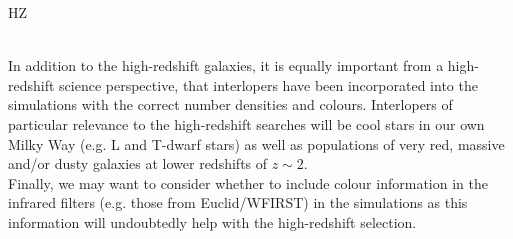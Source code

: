 \begin{tasklist}{HZ}
\begin{task}
{\\
In addition to the high-redshift galaxies, it is equally important from a high-redshift science perspective, that interlopers have been incorporated into the simulations with the correct number densities and colours. Interlopers of particular relevance to the high-redshift searches will be cool stars in our own Milky Way (e.g. L and T-dwarf stars) as well as populations of very red, massive and/or dusty galaxies at lower redshifts of $z\sim2$.
\\
Finally, we may want to consider whether to include colour information in the infrared filters (e.g. those from Euclid/WFIRST) in the simulations as this information will undoubtedly help with the high-redshift selection.
 }
\end{task}
\end{tasklist}
